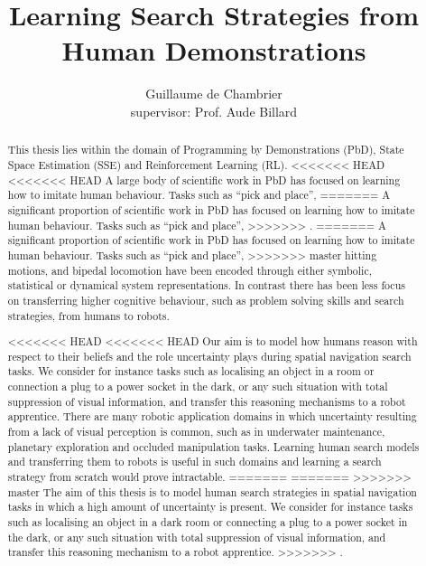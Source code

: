 \documentclass[a4paper,10pt]{article}
\title{Learning Search Strategies from Human Demonstrations}
\author[]{Guillaume de Chambrier\\supervisor: Prof. Aude Billard}
\affil[]{École Polytechnique Fédérale de Lausanne (EPFL), LASA}
\begin{document}
\maketitle

\begin{abstract}
 
This thesis lies within the domain of Programming by Demonstrations (PbD), State Space Estimation (SSE) and Reinforcement Learning (RL). 
<<<<<<< HEAD
<<<<<<< HEAD
A large body of scientific work in PbD has focused on learning how to imitate human behaviour. Tasks such as ``pick and place'', 
=======
A significant proportion of scientific work in PbD has focused on learning how to imitate human behaviour. Tasks such as ``pick and place'', 
>>>>>>> .
=======
A significant proportion of scientific work in PbD has focused on learning how to imitate human behaviour. Tasks such as ``pick and place'', 
>>>>>>> master
hitting motions, and bipedal locomotion have been encoded through either symbolic, statistical or dynamical system representations. 
In contrast there has been less focus on transferring higher cognitive behaviour, such as problem solving skills and search strategies,
from humans to robots. 

<<<<<<< HEAD
<<<<<<< HEAD
Our aim is to model how humans reason with respect to their beliefs and the role uncertainty plays during spatial navigation search tasks. 
We consider for instance tasks such as localising  an object in a room or connection a plug to a power socket in the dark, 
or any such situation with total suppression of visual information, and transfer this reasoning mechanisms to a robot apprentice. 
There are many robotic application domains in which uncertainty resulting from a lack of visual perception is common, such as in underwater 
maintenance, planetary exploration and occluded manipulation tasks. Learning human search models and transferring them to robots is useful
in such domains and learning a search strategy from scratch would prove intractable.
=======
=======
>>>>>>> master
The aim of this thesis is to model human search strategies in spatial navigation tasks in which a high amount of uncertainty is present.
We consider for instance tasks such as localising  an object in a dark room or connecting a plug to a power socket in the dark, 
or any such situation with total suppression of visual information, and transfer this reasoning mechanism to a robot apprentice. 
>>>>>>> .


\end{abstract}
\end{document}
